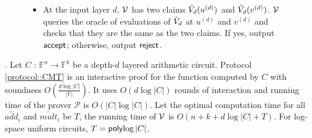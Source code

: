 \begin{figure}[t!]
{{{{\begin{construction}
\begin{itemize}
\begin{itemize}
			\item At the end of the sumcheck protocol, $\P$ sends $\V$ $\tV_{i+1}(u^{(i+1)})$ and $\tV_{i+1}(v^{(i+1)})$.
			
		
			\item $\V$ computes the following and checks if it equals to the last message of the sumcheck.
			\begin{align*}
			&(\alpha^{(i)}\tilde{mult}_{i+1}(u^{(i)}, u^{(i+1)}, v^{(i+1)})+\beta^{(i)}\tilde{mult}_{i+1}(v^{(i)}, u^{(i+1)}, v^{(i+1)}))(\tV_{i+1}(u^{(i+1)})\tV_{i+1}(v^{(i+1)}))+\\
			&(\alpha^{(i)}\tilde{add}_{i+1}(u^{(i)}, u^{(i+1)}, v^{(i+1)})+\beta^{(i)}\tilde{add}_{i+1}(v^{(i)}, u^{(i+1)}, v^{(i+1)}))(\tV_{i+1}(u^{(i+1)})+\tV_{i+1}(v^{(i+1)}))
			\end{align*}
			If all checks in the sumcheck pass, $V$ uses $\tV_{i+1}(u^{(i+1)})$ and $\tV_{i+1}(v^{(i+1)})$ to proceed to the $(i+1)$-th layer. Otherwise, $\V$ outputs $\reject$ and aborts.
			
		\end{itemize}
		\item At the input layer $d$, $\V$ has two claims $\tilde{V}_{d}(u^{(d)})$ and $\tilde{V}_{d}(v^{(d)})$. $\V$ queries the oracle of evaluations of $\tilde{V}_d$ at $u^{(d)}$ and $v^{(d)}$ and checks that they are the same as the two claims. If yes, output $\mathsf{accept}$; otherwise, output $\reject$.
		
	\end{itemize}
\end{construction}}}}}
\end{figure}
\begin{theorem}\cite{VSA13}\cite{JT_Thesis}\cite{CMT}\cite{GKR}. Let $C$ : $\mathbb{F}^n \rightarrow \mathbb{F}^k$ be a depth-$d$ layered arithmetic circuit. Protocol \ref{protocol::CMT} is an interactive proof for the function computed by $C$ with soundness $O(\frac{d\log {|C|}}{|\mathbb{F}|})$. It uses $O(d \log |C|)$ rounds of interaction and running time of the prover $\mathcal{P}$ is $O(|C|\log |C|)$. Let the optimal computation time for all $\tilde{add_i}$ and $\tilde{mult_i}$ be $T$, the running time of $\V$ is $O(n+k+d\log |C|+T)$. For log-space uniform circuits, $T={\sf poly}{\log |C|}$.
\end{theorem}